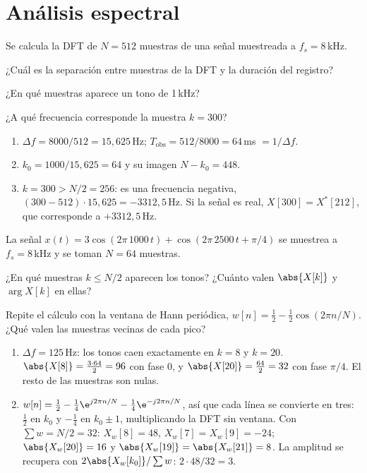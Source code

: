 \documentclass[11pt,a4paper]{scrartcl}
\begin{document}
\section*{Análisis espectral}

\begin{ejercicio}
  Se calcula la DFT de $N=512$ muestras de una señal muestreada a $f_s=8$\,kHz.
  \begin{incisos}[1]
    \item ¿Cuál es la separación entre muestras de la DFT y la duración del registro?
    \item ¿En qué muestras aparece un tono de 1\,kHz?
    \item ¿A qué frecuencia corresponde la muestra $k=300$?
  \end{incisos}
\end{ejercicio}
\begin{solucion}
  \begin{enumerate}[label=\alph*)]
    \item $\Delta f=8000/512=15{,}625$\,Hz; $T_{\text{obs}}=512/8000=64$\,ms $=1/\Delta f$.
    \item $k_0=1000/15{,}625=64$ y su imagen $N-k_0=448$.
    \item $k=300>N/2=256$: es una frecuencia negativa, $(300-512)\cdot15{,}625=-3312{,}5$\,Hz. Si la señal es real, $X[300]=X^*[212]$, que corresponde a $+3312{,}5$\,Hz.
  \end{enumerate}
\end{solucion}

\begin{ejercicio}
  La señal $x(t)=3\cos(2\pi\,1000\,t)+\cos(2\pi\,2500\,t+\pi/4)$ se muestrea a $f_s=8$\,kHz y se toman $N=64$ muestras.
  \begin{incisos}[1]
    \item ¿En qué muestras $k\le N/2$ aparecen los tonos? ¿Cuánto valen $\abs{X[k]}$ y $\arg X[k]$ en ellas?
    \item Repite el cálculo con la ventana de Hann periódica, $w[n]=\frac12-\frac12\cos(2\pi n/N)$. ¿Qué valen las muestras vecinas de cada pico?
  \end{incisos}
\end{ejercicio}
\begin{solucion}
  \begin{enumerate}[label=\alph*)]
    \item $\Delta f=125$\,Hz: los tonos caen exactamente en $k=8$ y $k=20$. $\abs{X[8]}=\frac{3\cdot64}2=96$ con fase 0, y $\abs{X[20]}=\frac{64}{2}=32$ con fase $\pi/4$. El resto de las muestras son nulas.
    \item $w[n]=\frac12-\frac14\e^{j2\pi n/N}-\frac14\e^{-j2\pi n/N}$, así que cada línea se convierte en tres: $\frac12$ en $k_0$ y $-\frac14$ en $k_0\pm1$, multiplicando la DFT sin ventana. Con $\sum w=N/2=32$: $X_w[8]=48$, $X_w[7]=X_w[9]=-24$; $\abs{X_w[20]}=16$ y $\abs{X_w[19]}=\abs{X_w[21]}=8$. La amplitud se recupera con $2\abs{X_w[k_0]}/\sum w$: $2\cdot48/32=3$.
  \end{enumerate}
\end{solucion}
\end{document}
